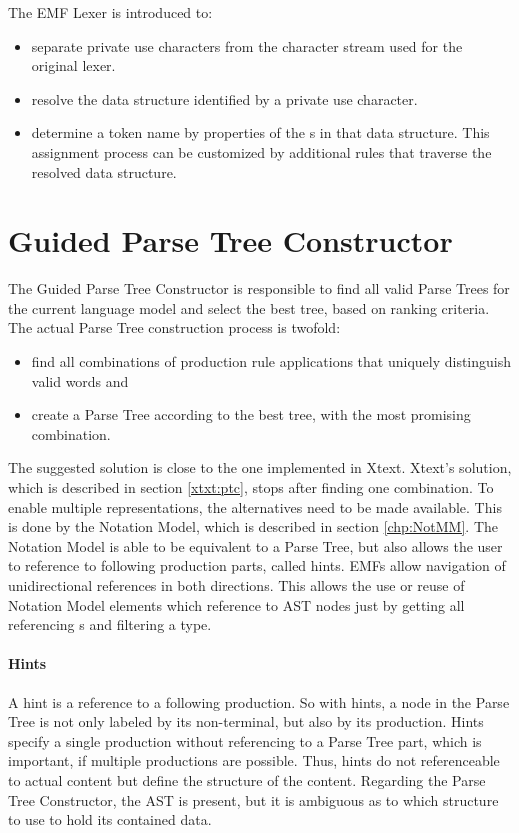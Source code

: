 The EMF Lexer is introduced to:
\begin{itemize}
	\item separate private use characters from the character stream used for the original lexer.
	\item resolve the data structure identified by a private use character.
	\item determine a token name by properties of the s in that data structure. This assignment process can be customized by additional rules that traverse the resolved data structure.
\end{itemize}



\section{Guided Parse Tree Constructor}
The Guided Parse Tree Constructor is responsible to find all valid Parse Trees for the current language model and select the best tree, based on ranking criteria. The actual Parse Tree construction process is twofold:
\begin{itemize}
	\item find all combinations of production rule applications that uniquely distinguish valid words and
	\item create a Parse Tree according to the best tree, with the most promising combination.
\end{itemize}
 
The suggested solution is close to the one implemented in Xtext. Xtext's solution, which is described in section \ref{xtxt:ptc}, stops after finding one combination. 
To enable multiple representations, the alternatives need to be made available. This is done by the Notation Model, which is described in section \ref{chp:NotMM}. The Notation Model is able to be equivalent to a Parse Tree, but also allows the user to reference to following production parts, called hints. EMFs  allow navigation of unidirectional references in both directions. This allows the use or reuse of Notation Model elements which reference to AST nodes just by getting all referencing s and filtering a type.

\paragraph{Hints}
A hint is a reference to a following production. So with hints, a node in the Parse Tree is not only labeled by its non-terminal, but also by its production. Hints specify a single production without referencing to a Parse Tree part, which is important, if multiple productions are possible. Thus, hints do not referenceable to actual content but define the structure of the content. Regarding the Parse Tree Constructor, the AST is present, but it is ambiguous as to which structure to use to hold its contained data.  

